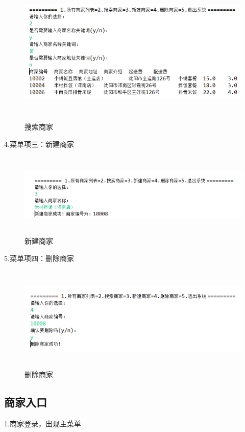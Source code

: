 \begin{figure}[H]
    \centering
    \includegraphics[width=15cm,height=7cm]{figures/jdbc3.png}
    \caption{搜索商家}
\end{figure}


4.菜单项三：新建商家

\begin{figure}[H]
    \centering
    \includegraphics[width=15cm,height=4cm]{figures/jdbc4.png}
    \caption{新建商家}
\end{figure}

5.菜单项四：删除商家

\begin{figure}[H]
    \centering
    \includegraphics[width=15cm,height=5cm]{figures/jdbc5.png}
    \caption{删除商家}
\end{figure}

\subsection{商家入口}
1.商家登录，出现主菜单


